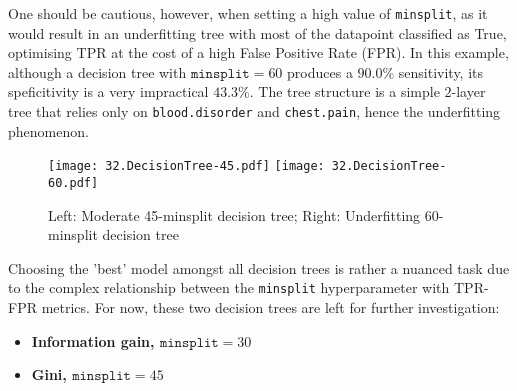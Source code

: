 One should be cautious, however, when setting a high value of \texttt{minsplit}, as it would result in an underfitting tree with most of the datapoint classified as True, optimising TPR at the cost of a high False Positive Rate (FPR). In this example, although a decision tree with \( \texttt{minsplit} = 60 \) produces a \( 90.0\% \) sensitivity, its speficitivity is a very impractical \( 43.3\% \). The tree structure is a simple \( 2 \)-layer tree that relies only on \texttt{blood.disorder} and \texttt{chest.pain}, hence the underfitting phenomenon.

\begin{figure}[h]
    \centering
    \texttt{[image: 32.DecisionTree-45.pdf]}
    \texttt{[image: 32.DecisionTree-60.pdf]}
    \caption{\centering Left: Moderate 45-minsplit decision tree; Right: Underfitting 60-minsplit decision tree}
\end{figure}

Choosing the 'best' model amongst all decision trees is rather a nuanced task due to the complex relationship between the \texttt{minsplit} hyperparameter with TPR-FPR metrics. For now, these two decision trees are left for further investigation:
\begin{itemize}
    \item \textbf{Information gain, \( \texttt{minsplit} = 30 \)}
    \item \textbf{Gini, \( \texttt{minsplit} = 45 \)}
\end{itemize}
